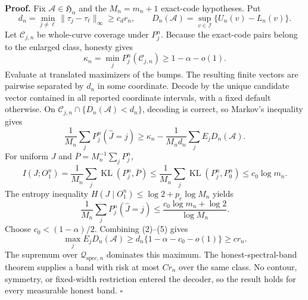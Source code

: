 \textbf{Proof.}
Fix \(\mathcal A\in\mathfrak H_\alpha\) and the \(M_n=m_n+1\) exact-code hypotheses.  Put
\[
 d_n=\min_{j\ne\ell}\|\tau_j-\tau_\ell\|_\infty\ge c_dr_n,
 \qquad D_n(\mathcal A)=\sup_{v\in\mathcal I}\{U_n(v)-L_n(v)\}. \tag{1}
\]
Let \(\mathcal C_{j,n}\) be whole-curve coverage under \(P_j^n\).  Because the exact-code pairs belong to the enlarged class, honesty gives
\[
 \kappa_n=\min_jP_j^n(\mathcal C_{j,n})\ge1-\alpha-o(1). \tag{2}
\]
Evaluate at translated maximizers of the bumps.  The resulting finite vectors are pairwise separated by \(d_n\) in some coordinate.  Decode by the unique candidate vector contained in all reported coordinate intervals, with a fixed default otherwise.  On \(\mathcal C_{j,n}\cap\{D_n(\mathcal A)<d_n\}\), decoding is correct, so Markov's inequality gives
\[
 \frac1{M_n}\sum_jP_j^n(\widehat J=j)
 \ge\kappa_n-\frac1{M_nd_n}\sum_jE_jD_n(\mathcal A). \tag{3}
\]
For uniform \(J\) and \(\overline P=M_n^{-1}\sum_jP_j^n\),
\[
 I(J;O_1^n)=\frac1{M_n}\sum_j\operatorname{KL}(P_j^n,\overline P)
 \le\frac1{M_n}\sum_j\operatorname{KL}(P_j^n,P_0^n)
 \le c_0\log m_n. \tag{4}
\]
The entropy inequality \(H(J\mid O_1^n)\le\log2+p_e\log M_n\) yields
\[
 \frac1{M_n}\sum_jP_j^n(\widehat J=j)
 \le\frac{c_0\log m_n+\log2}{\log M_n}. \tag{5}
\]
Choose \(c_0<(1-\alpha)/2\).  Combining (2)--(5) gives
\[
 \max_jE_jD_n(\mathcal A)
 \ge d_n\{1-\alpha-c_0-o(1)\}\ge cr_n. \tag{6}
\]
The supremum over \(\mathcal Q_{\mathrm{spec},n}\) dominates this maximum.  The honest-spectral-band theorem supplies a band with risk at most \(Cr_n\) over the same class.  No contour, symmetry, or fixed-width restriction entered the decoder, so the result holds for every measurable honest band. \(\square\)
